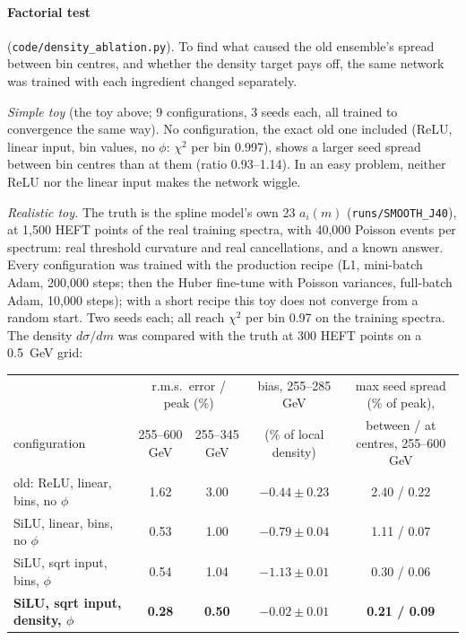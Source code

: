 \documentclass[11pt]{article}
\newcommand{\file}[1]{\nolinkurl{#1}}
\begin{document}
\paragraph{Factorial test} (\file{code/density_ablation.py}). To find what caused the old ensemble's
spread between bin centres, and whether the density target pays off, the same network was trained
with each ingredient changed separately.

\emph{Simple toy} (the toy above; 9 configurations, 3 seeds each, all trained to convergence the same
way). No configuration, the exact old one included (ReLU, linear input, bin values, no $\phi$:
$\chi^2$ per bin 0.997), shows a larger seed spread between bin centres than at them (ratio
0.93--1.14). In an easy problem, neither ReLU nor the linear input makes the network wiggle.

\emph{Realistic toy.} The truth is the spline model's own 23 $a_i(m)$ (\file{runs/SMOOTH_J40}), at
1,500 HEFT points of the real training spectra, with 40,000 Poisson events per spectrum: real
threshold curvature and real cancellations, and a known answer. Every configuration was trained with
the production recipe (L1, mini-batch Adam, 200,000 steps; then the Huber fine-tune with Poisson
variances, full-batch Adam, 10,000 steps); with a short recipe this toy does not converge from a random
start. Two seeds each; all reach $\chi^2$ per bin 0.97 on the training spectra. The density
$d\sigma/dm$ was compared with the truth at 300 HEFT points on a 0.5~GeV grid:

\begin{center}
\footnotesize
\setlength{\tabcolsep}{3pt}
\begin{tabular}{lcccc}
\toprule
 & \multicolumn{2}{c}{r.m.s.\ error / peak (\%)} & bias, 255--285 GeV & max seed spread (\% of peak),\\
configuration & 255--600 GeV & 255--345 GeV & (\% of local density) & between / at centres, 255--600 GeV\\
\midrule
old: ReLU, linear, bins, no $\phi$ & 1.62 & 3.00 & $-0.44 \pm 0.23$ & 2.40 / 0.22\\
SiLU, linear, bins, no $\phi$ & 0.53 & 1.00 & $-0.79 \pm 0.04$ & 1.11 / 0.07\\
SiLU, sqrt input, bins, $\phi$ & 0.54 & 1.04 & $-1.13 \pm 0.01$ & 0.30 / 0.06\\
\textbf{SiLU, sqrt input, density, $\phi$} & \textbf{0.28} & \textbf{0.50} & $\mathbf{-0.02 \pm 0.01}$ & \textbf{0.21 / 0.09}\\
\bottomrule
\end{tabular}
\end{center}
\end{document}
